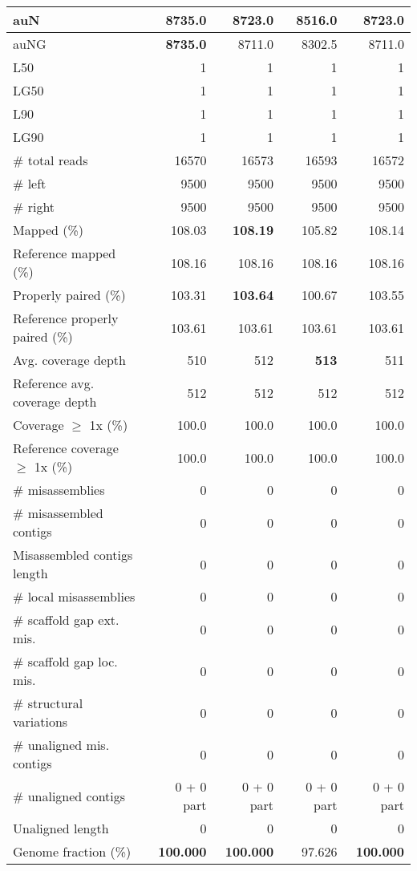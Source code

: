 \documentclass[12pt,a4paper]{article}
\begin{document}
\begin{table}[ht]
\begin{center}
\begin{tabular}{|l*{4}{|r}|}
auN & {\bf 8735.0} & 8723.0 & 8516.0 & 8723.0 \\ \hline
auNG & {\bf 8735.0} & 8711.0 & 8302.5 & 8711.0 \\ \hline
L50 & 1 & 1 & 1 & 1 \\ \hline
LG50 & 1 & 1 & 1 & 1 \\ \hline
L90 & 1 & 1 & 1 & 1 \\ \hline
LG90 & 1 & 1 & 1 & 1 \\ \hline
\# total reads & 16570 & 16573 & 16593 & 16572 \\ \hline
\# left & 9500 & 9500 & 9500 & 9500 \\ \hline
\# right & 9500 & 9500 & 9500 & 9500 \\ \hline
Mapped (\%) & 108.03 & {\bf 108.19} & 105.82 & 108.14 \\ \hline
Reference mapped (\%) & 108.16 & 108.16 & 108.16 & 108.16 \\ \hline
Properly paired (\%) & 103.31 & {\bf 103.64} & 100.67 & 103.55 \\ \hline
Reference properly paired (\%) & 103.61 & 103.61 & 103.61 & 103.61 \\ \hline
Avg. coverage depth & 510 & 512 & {\bf 513} & 511 \\ \hline
Reference avg. coverage depth & 512 & 512 & 512 & 512 \\ \hline
Coverage $\geq$ 1x (\%) & 100.0 & 100.0 & 100.0 & 100.0 \\ \hline
Reference coverage $\geq$ 1x (\%) & 100.0 & 100.0 & 100.0 & 100.0 \\ \hline
\# misassemblies & 0 & 0 & 0 & 0 \\ \hline
\# misassembled contigs & 0 & 0 & 0 & 0 \\ \hline
Misassembled contigs length & 0 & 0 & 0 & 0 \\ \hline
\# local misassemblies & 0 & 0 & 0 & 0 \\ \hline
\# scaffold gap ext. mis. & 0 & 0 & 0 & 0 \\ \hline
\# scaffold gap loc. mis. & 0 & 0 & 0 & 0 \\ \hline
\# structural variations & 0 & 0 & 0 & 0 \\ \hline
\# unaligned mis. contigs & 0 & 0 & 0 & 0 \\ \hline
\# unaligned contigs & 0 + 0 part & 0 + 0 part & 0 + 0 part & 0 + 0 part \\ \hline
Unaligned length & 0 & 0 & 0 & 0 \\ \hline
Genome fraction (\%) & {\bf 100.000} & {\bf 100.000} & 97.626 & {\bf 100.000} \\ \hline

\end{tabular}
\end{center}
\end{table}
\end{document}
